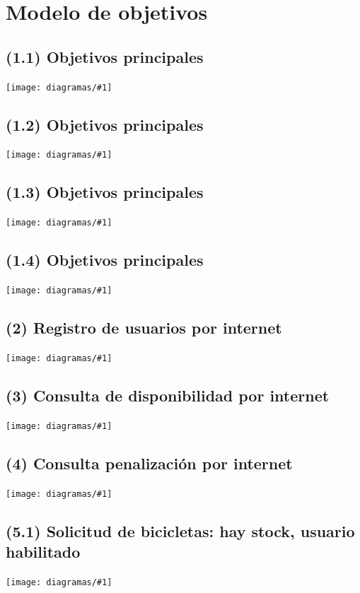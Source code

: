 \documentclass[a4paper, 10pt, twoside]{article}
\newcommand{\diagramav}[1]{
  \texttt{[image: diagramas/\#1]}
}
\newcommand{\diagramah}[1]{
  \texttt{[image: diagramas/\#1]}
}
\begin{document}


\section{Modelo de objetivos}

\subsection{(1.1)  Objetivos principales}
\diagramav{objetivos-1.1}

\subsection{(1.2)  Objetivos principales}
\diagramah{objetivos-1.2}

\subsection{(1.3)  Objetivos principales}
\diagramav{objetivos-1.3}

\subsection{(1.4)  Objetivos principales}
\diagramah{objetivos-1.4}

\subsection{(2)    Registro de usuarios por internet}
\diagramah{objetivos-2}

\subsection{(3)    Consulta de disponibilidad por internet}
\diagramah{objetivos-3}

\subsection{(4)    Consulta penalización por internet}
\diagramah{objetivos-4}

\subsection{(5.1)  Solicitud de bicicletas: hay stock, usuario habilitado}
\diagramah{objetivos-5.1}
\end{document}
